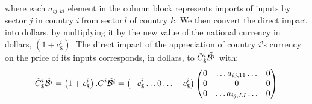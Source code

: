 \documentclass[11pt,a4paper]{paper} %
\begin{document}
where each ${{{a}}_{{ij,kl}}}$ element in the column block represents imports of inputs by sector $j$ in country $i~$from sector$~l$ of country $k$.
We then convert the direct impact into dollars, by multiplying it by the new value of the national currency in dollars, $\left(1+c_\$^i\right)$. The direct impact of the appreciation of country $i$’s currency on the price of its inputs corresponds, in dollars, to ${\tilde{C}_\$^i}{\tilde{{\cal B}^i}}$ with: 
\begin{eqnarray}
{\tilde{C}_\$^i}{\tilde{{\cal B}^i}}=\left(1+c_\$^i\right).C^i{\tilde{{\cal B}^i}}=
\left(-c_\$^i\ldots0\ldots-c_\$^i\right)\left(\begin{matrix}0&\ldots{{{a}}_{ij,11}}\ldots&0\\0&0&0\\0&\ldots{{a}_{{ij,IJ}}}\ldots&0\\\end{matrix}\right) 
\label{eq:eq4}
 \end{eqnarray}



\end{document}
